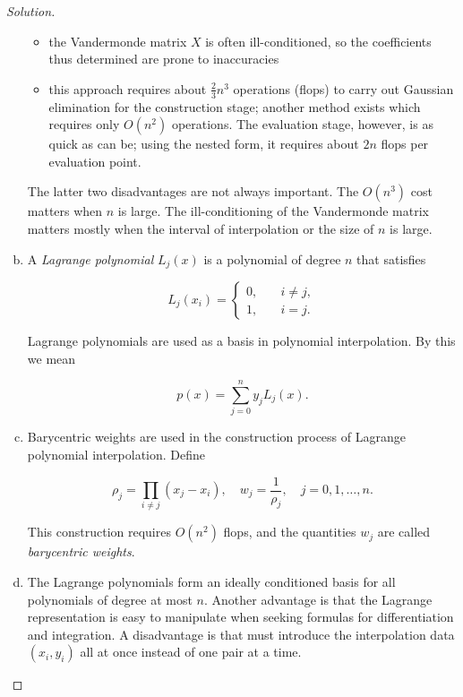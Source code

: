 \documentclass[12pt,a4]{article}
\theoremstyle{definition}
\begin{document}
\begin{proof}[Solution]
\begin{enumerate}[(a)]
\begin{itemize}
			\item the Vandermonde matrix $X$ is often ill-conditioned, so the coefficients thus determined are prone to inaccuracies 
			
			\item this approach requires about $\frac{2}{3} n^3$ operations (flops) to carry out Gaussian elimination for the construction stage; another method exists which requires only $O(n^2)$ operations. The evaluation stage, however, is as quick as can be; using the nested form, it requires about $2 n$ flops per evaluation point. 
		\end{itemize} 
		
		The latter two disadvantages are not always important. The $O(n^3)$ cost matters when $n$ is large. The ill-conditioning of the Vandermonde matrix matters mostly when the interval of interpolation or the size of $n$ is large. 
		
		\item A \emph{Lagrange polynomial} $L_j(x)$ is a polynomial of degree $n$ that satisfies
		
		\[
		L_j(x_i) = \begin{cases}
		0 {,} &\quad i \neq j {,} \\
		1 {,} &\quad i = j {.}
		\end{cases}
		\]
		
		Lagrange polynomials are used as a basis in polynomial interpolation. By this we mean 
		
		\[
		p(x) = \sum_{j = 0}^{n} y_j L_j(x) {.} 
		\]
		
		\item Barycentric weights are used in the construction process of Lagrange polynomial interpolation. Define
		
		\[
		\rho_j = \prod_{i \neq j} (x_j - x_i) {,} \quad w_j = \frac{1}{\rho_j} {,} \quad j = 0, 1, \ldots, n {.}
		\]
		
		This construction requires $O(n^2)$ flops, and the quantities $w_j$ are called \emph{barycentric weights}. 
		
		\item The Lagrange polynomials form an ideally conditioned basis for all polynomials of degree at most $n$. Another advantage is that the Lagrange representation is easy to manipulate when seeking formulas for differentiation and integration. A disadvantage is that must introduce the interpolation data $(x_i, y_i)$ all at once instead of one pair at a time. 
		

\end{enumerate}
\end{proof}
\end{document}
